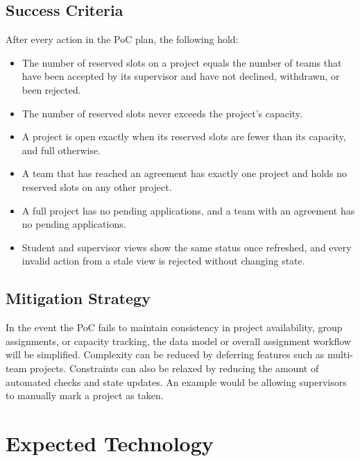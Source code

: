 \documentclass{article}
\begin{document}
\subsection{Success Criteria}
\label{sec:poc-success}
After every action in the PoC plan, the following hold:
\begin{itemize}
    \item The number of reserved slots on a project equals the number of teams
          that have been accepted by its supervisor and have not declined,
          withdrawn, or been rejected.
    \item The number of reserved slots never exceeds the project's capacity.
    \item A project is open exactly when its reserved slots are fewer than its
          capacity, and full otherwise.
    \item A team that has reached an agreement has exactly one project and holds
          no reserved slots on any other project.
    \item A full project has no pending applications, and a team with an
          agreement has no pending applications.
    \item Student and supervisor views show the same status once refreshed, and
          every invalid action from a stale view is rejected without changing
          state.
\end{itemize}

\subsection{Mitigation Strategy}
In the event the PoC fails to maintain consistency in project availability,
group assignments, or capacity tracking, the data model or overall assignment
workflow will be simplified. Complexity can be reduced by deferring features
such as multi-team projects. Constraints can also be relaxed by reducing the
amount of automated checks and state updates. An example would be allowing
supervisors to manually mark a project as taken.

\section{Expected Technology}

\label{sec:tech}

\end{document}
